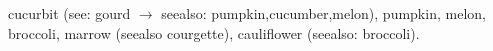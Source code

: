 \documentclass{article}
\begin{document}
\gls{cucurbit} (see: gourd $\to$ seealso: pumpkin,cucumber,melon), 
\gls{pumpkin}, \gls{melon}, 
\gls{broccoli},
\gls{marrow} (seealso courgette), \gls{cauliflower} (seealso: broccoli).

\printunsrtglossary[title=Index]
\end{document}
